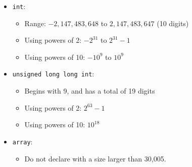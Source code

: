 \begin{itemize}
    \item \texttt{int}:
    \begin{itemize}
        \item Range: $-2,147,483,648$ to $2,147,483,647$ (10 digits)
        \item Using powers of 2: $-2^{31}$ to $2^{31} - 1$
        \item Using powers of 10: $-10^9$ to $10^9$
    \end{itemize}
    
    \item \texttt{unsigned long long int}:
    \begin{itemize}
        \item Begins with 9, and has a total of 19 digits
        \item Using powers of 2: $2^{63} - 1$
        \item Using powers of 10: $10^{18}$
    \end{itemize}
    
    \item \texttt{array}:
    \begin{itemize}
        \item Do not declare with a size larger than 30,005.
    \end{itemize}
\end{itemize}



